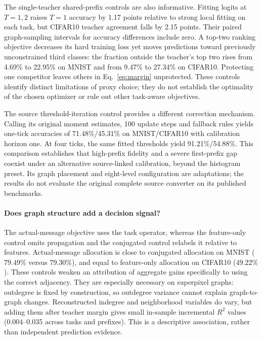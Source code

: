 \documentclass[10pt,twocolumn,letterpaper]{article}
\begin{document}
The single-teacher shared-prefix controls are also informative. Fitting logits at $T=1,2$ raises $T=1$ accuracy by 1.17 points relative to strong local fitting on each task, but CIFAR10 teacher agreement falls by 2.15 points. Their paired graph-sampling intervals for accuracy differences include zero. A top-two ranking objective decreases its hard training loss yet moves predictions toward previously unconstrained third classes: the fraction outside the teacher's top two rises from 4.69\% to 22.95\% on MNIST and from 9.47\% to 27.34\% on CIFAR10. Protecting one competitor leaves others in Eq.~\eqref{eq:margin} unprotected. These controls identify distinct limitations of proxy choice; they do not establish the optimality of the chosen optimizer or rule out other task-aware objectives.

The source threshold-iteration control provides a different correction mechanism. Calling its original moment estimates, 100 update steps and fallback rules yields one-tick accuracies of 71.48\%/45.31\% on MNIST/CIFAR10 with calibration horizon one. At four ticks, the same fitted thresholds yield 91.21\%/54.88\%. This comparison establishes that high-prefix fidelity and a severe first-prefix gap coexist under an alternative source-linked calibration, beyond the histogram preset. Its graph placement and eight-level configuration are adaptations; the results do not evaluate the original complete source converter on its published benchmarks.

\paragraph{Does graph structure add a decision signal?}
The actual-message objective uses the task operator, whereas the feature-only control omits propagation and the conjugated control relabels it relative to features. Actual-message allocation is close to conjugated allocation on MNIST ($79.49\%$ versus $79.30\%$), and equal to feature-only allocation on CIFAR10 ($49.22\%$). These controls weaken an attribution of aggregate gains specifically to using the correct adjacency. They are especially necessary on superpixel graphs: outdegree is fixed by construction, so outdegree variance cannot explain graph-to-graph changes. Reconstructed indegree and neighborhood variables do vary, but adding them after teacher margin gives small in-sample incremental $R^2$ values (0.004--0.035 across tasks and prefixes). This is a descriptive association, rather than independent prediction evidence.
\end{document}
